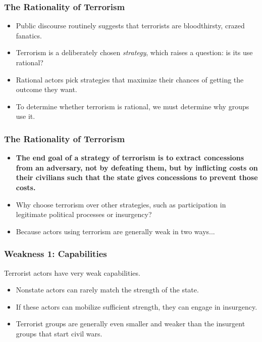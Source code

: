 \documentclass{beamer}
\begin{document}
\begin{frame} 
\frametitle{\LARGE{The Rationality of Terrorism}}
\begin{itemize}
	    \item Public discourse routinely suggests that terrorists are bloodthirsty, crazed fanatics. \pause 
	    \item Terrorism is a deliberately chosen \textit{strategy}, which raises a question: is its use rational? \pause
		\item Rational actors pick strategies that maximize their chances of getting the outcome they want. \pause 
		\item To determine whether terrorism is rational, we must determine why groups use it.
\end{itemize}
\end{frame}

\begin{frame} 
	\frametitle{\LARGE{The Rationality of Terrorism}}
	\begin{itemize}
		\item \textbf{The end goal of a strategy of terrorism is to extract concessions from an adversary, not by defeating them, but by inflicting costs on their civilians such that the state gives concessions to prevent those costs.} \pause
		\item Why choose terrorism over other strategies, such as participation in legitimate political processes or insurgency? \pause
		\item Because actors using terrorism are generally weak in two ways...
	\end{itemize}
\end{frame}


\begin{frame} 
\frametitle{\LARGE{Weakness 1: Capabilities}}
Terrorist actors have very weak capabilities. \pause
\begin{itemize}
		\item Nonstate actors can rarely match the strength of the state. \pause 
		\item If these actors can mobilize sufficient strength, they can engage in insurgency. \pause 
		\item Terrorist groups are generally even smaller and weaker than the insurgent groups that start civil wars.
\end{itemize}
\end{frame}
\end{document}
